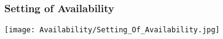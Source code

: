 \subsubsection{Setting of Availability}
	\texttt{[image: Availability/Setting\_Of\_Availability.jpg]}
